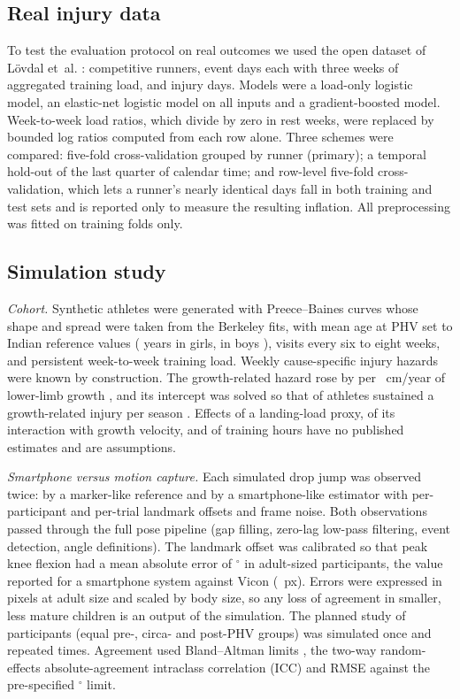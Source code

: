 \documentclass[journal]{IEEEtran}
\begin{document}
\subsection{Real injury data}
To test the evaluation protocol on real outcomes we used the open dataset of
L\"ovdal et~al. \cite{lovdal2021,lovdal2021data}: \RunRunners{} competitive runners,
\RunRows{} event days each with three weeks of aggregated training load, and \RunInjuries{}
injury days. Models were a load-only logistic model, an elastic-net logistic model on all
inputs and a gradient-boosted model. Week-to-week load ratios, which divide by zero in rest
weeks, were replaced by bounded log ratios computed from each row alone. Three schemes were
compared: five-fold cross-validation grouped by runner (primary); a temporal hold-out of the
last quarter of calendar time; and row-level five-fold cross-validation, which lets a runner's
nearly identical days fall in both training and test sets and is reported only to measure the
resulting inflation. All preprocessing was fitted on training folds only.

\subsection{Simulation study}
\emph{Cohort.} Synthetic athletes were generated with Preece--Baines curves whose shape and
spread were taken from the Berkeley fits, with mean age at PHV set to Indian reference values
(\SpecFemaleAPHV{} years in girls, \SpecMaleAPHV{} in boys \cite{khadilkar2019}), visits every
six to eight weeks, and persistent week-to-week training load. Weekly cause-specific injury
hazards were known by construction. The growth-related hazard rose by \SpecRiskIncrease{} per
\SpecRiskGrowth{}~cm/year of lower-limb growth \cite{hall2025}, and its intercept was solved so
that \SpecIncidence{} of athletes sustained a growth-related injury per season
\cite{oxendale2025}. Effects of a landing-load proxy, of its interaction with growth velocity,
and of training hours have no published estimates and are assumptions.

\emph{Smartphone versus motion capture.} Each simulated drop jump was observed twice: by a
marker-like reference and by a smartphone-like estimator with per-participant and per-trial
landmark offsets and frame noise. Both observations passed through the full pose pipeline
(gap filling, zero-lag low-pass filtering, event detection, angle definitions). The landmark
offset was calibrated so that peak knee flexion had a mean absolute error of
\SpecTargetMAE{}$^\circ$ in adult-sized participants, the value reported for a smartphone
system against Vicon \cite{barzyk2024} (\ValOffset{}~px). Errors were expressed in pixels at
adult size and scaled by body size, so any loss of agreement in smaller, less mature children is
an output of the simulation. The planned study of \SpecValN{} participants (equal pre-, circa-
and post-PHV groups) was simulated once and repeated \ValStudies{} times. Agreement used
Bland--Altman limits \cite{bland1986}, the two-way random-effects absolute-agreement intraclass correlation (ICC) and RMSE against the pre-specified
\SpecRmseLimit{}$^\circ$ limit.
\end{document}
